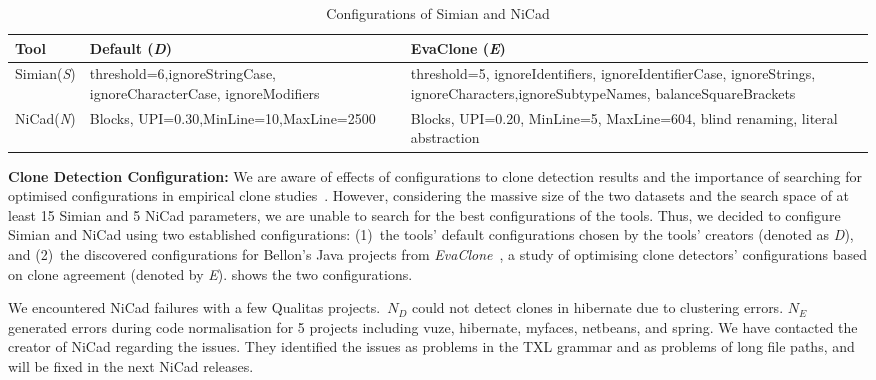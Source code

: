 \documentclass[sigconf,review, anonymous]{acmart}
\begin{document}
\begin{table}
  \centering
  \caption{Configurations of Simian and NiCad}
  \label{t:param_tuning}
  \small
  \begin{tabular}{p{0.7cm}|p{2.4cm}p{3.8cm}}
    \hline 
    Tool & Default (\textit{D}) & EvaClone (\textit{E}) \\
    \hline
    Simian\newline (\textit{S}) &  threshold=6,\newline ignoreStringCase, \newline ignoreCharacterCase, \newline ignoreModifiers & threshold=5, ignoreIdentifiers, \newline ignoreIdentifierCase, \newline ignoreStrings, ignoreCharacters,\newline ignoreSubtypeNames, \newline balanceSquareBrackets \\ 
    \hline 
    NiCad\newline (\textit{N}) & Blocks, UPI=0.30,\newline MinLine=10,\newline MaxLine=2500 & Blocks, UPI=0.20, \newline MinLine=5, MaxLine=604, \newline blind renaming, literal abstraction \\
    \hline
  \end{tabular} %
\end{table}

\textbf{Clone Detection Configuration: }
We are aware of effects of configurations to clone detection results
and the importance of searching for optimised configurations in
empirical clone
studies~\cite{Svajlenko2014,Wang2014,cr2016ssbse,Ragkhitwetsagul2016}. However,
considering the massive size of the two datasets and the search space
of at least 15 Simian and 5 NiCad parameters, we are unable to search
for the best configurations of the tools. Thus, we decided to
configure Simian and NiCad using two established configurations:
(1)~the tools' default configurations chosen by the tools' creators
(denoted as \textit{D}), and (2)~the discovered configurations for
Bellon's Java projects from \textit{EvaClone}~\cite{Wang2013}, a study
of optimising clone detectors' configurations based on clone agreement
(denoted by \textit{E}).  shows the two configurations.

We encountered NiCad failures with a few Qualitas projects.~$N_D$
could not detect clones in \textsf{hibernate} due to clustering
errors. $N_E$ generated errors during code normalisation for 5
projects including \textsf{vuze}, \textsf{hibernate},
\textsf{myfaces}, \textsf{netbeans}, and \textsf{spring}. We have
contacted the creator of NiCad regarding the issues. They identified
the issues as problems in the TXL grammar and as problems of long file
paths, and will be fixed in the next NiCad releases.
\end{document}
